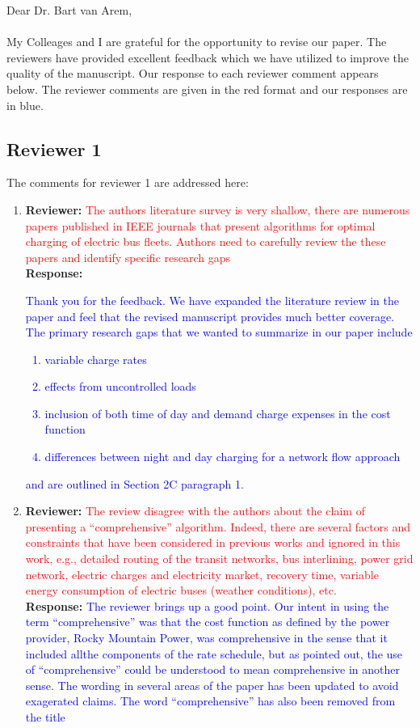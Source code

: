 \documentclass{article}
\newcommand\formatfeedback[2]
{%
	\textbf{Reviewer:} \textcolor{red}{#1} 
	\\[0.1in] \textbf{Response:} \textcolor{blue}{#2}
}
\begin{document}
\noindent Dear Dr. Bart van Arem, \\ \\
My Colleages and I are grateful for the opportunity to revise our paper. The reviewers have provided excellent feedback which we have utilized to improve the quality of the manuscript. Our response to each reviewer comment appears below. The reviewer comments are given in the red format and our responses are in blue.

\subsection*{Reviewer 1}
The comments for reviewer 1 are addressed here:
\begin{enumerate}
	\item \formatfeedback{The authors literature survey is very shallow, there are numerous papers published in IEEE journals that present algorithms for optimal charging of electric bus fleets. Authors need to carefully review the these papers and identify specific research gaps}%
			     {Thank you for the feedback. We have expanded the literature review in the paper and feel that the revised manuscript provides much better coverage. The primary research gaps that we wanted to summarize in our paper include
				\begin{enumerate}
					\item variable charge rates
					\item effects from uncontrolled loads
					\item inclusion of both time of day and demand charge expenses in the cost function
					\item differences between night and day charging for a network flow approach 
				\end{enumerate} 
			      and are outlined in Section 2C paragraph 1.}
	\item \formatfeedback{The review disagree with the authors about the claim of presenting a ``comprehensive'' algorithm. Indeed, there are several factors and constraints that have been considered in previous works and ignored in this work, e.g., detailed routing of the transit networks, bus interlining, power grid network, electric charges and electricity market, recovery time, variable energy consumption of electric buses (weather conditions), etc.}%
		             {The reviewer brings up a good point. Our intent in using the term ``comprehensive'' was that the cost function as defined by the power provider, Rocky Mountain Power, was comprehensive in the sense that it included allthe components of the rate schedule, but as pointed out, the use of ``comprehensive'' could be understood to mean comprehensive in another sense. The wording in several areas of the paper has been updated to avoid exagerated claims. The word ``comprehensive'' has also been removed from the title}

\end{enumerate}
\end{document}
